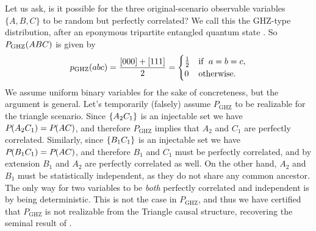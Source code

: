 Let us ask, is it possible for the three original-scenario observable variables $\{A,B,C\}$ to be random but perfectly correlated? We call this the GHZ-type distribution, after an eponymous tripartite entangled quantum state \cite{greenberger1989going,3Qubits2Ways}. So $P_{\text{GHZ}}\lparen A B C\rparen$ is given by
\begin{align}\label{eq:ghzdistribution1}
p_{\text{GHZ}}\lparen a b c\rparen=\frac{[000]+[111]}{2}=\begin{cases}\tfrac{1}{2}&\text{if }\; a=b=c, \\ 0&\text{otherwise}.\end{cases}
\end{align}
We assume uniform binary variables for the sake of concreteness, but the argument is general. Let's temporarily (falsely) assume $P_{\text{GHZ}}$ to be realizable for the triangle scenario. Since $\left\lbrace A_2 C_1\right\rbrace$ is an injectable set we have ${P_{}}\lparen A_2 C_1\rparen={P_{}}\lparen A C\rparen$, and therefore $P_{\text{GHZ}}$ implies that $A_2$ and $C_1$ are perfectly correlated. Similarly, since $\left\lbrace B_1 C_1\right\rbrace$ is an injectable set we have ${P_{}}\lparen B_1 C_1\rparen={P_{}}\lparen A C\rparen$, and therefore $B_1$ and $C_1$ must be perfectly correlated, and by extension $B_1$ and $A_2$ are perfectly correlated as well. On the other hand, $A_2$ and $B_1$ must be statistically independent, as they do not share any common ancestor. The only way for two variables to be \emph{both} perfectly correlated and independent is by being deterministic. This is not the case in $P_{\text{GHZ}}$, and thus we have certified that $P_{\text{GHZ}}$ is not realizable from the Triangle causal structure, recovering the seminal result of \citet{steudel2010ancestors}.

